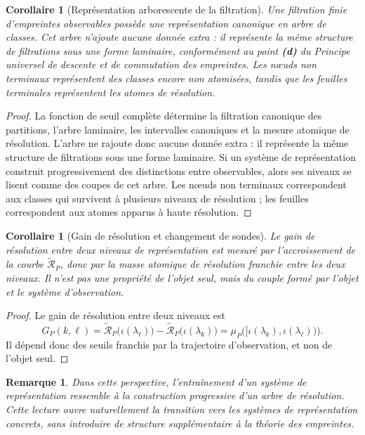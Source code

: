 \documentclass[11pt,a4paper,openany]{book}
\newtheorem{corollary}[definition]{Corollaire}
\newtheorem{remark}[definition]{Remarque}
\begin{document}
\begin{corollary}[Représentation arborescente de la filtration]
Une filtration finie d'empreintes observables possède une représentation canonique en arbre de classes. Cet arbre n'ajoute aucune donnée extra : il représente la même structure de filtrations sous une forme laminaire, conformément au point \textbf{(d)} du \emph{Principe universel de descente et de commutation des empreintes}. Les nœuds non terminaux représentent des classes encore non atomisées, tandis que les feuilles terminales représentent les atomes de résolution.
\end{corollary}

\begin{proof}
La fonction de seuil complète détermine la filtration canonique des partitions, l'arbre laminaire, les intervalles canoniques et la mesure atomique de résolution. L'arbre ne rajoute donc aucune donnée extra : il représente la même structure de filtrations sous une forme laminaire. Si un système de représentation construit progressivement des distinctions entre observables, alors ses niveaux se lisent comme des coupes de cet arbre. Les nœuds non terminaux correspondent aux classes qui survivent à plusieurs niveaux de résolution ; les feuilles correspondent aux atomes apparus à haute résolution.
\end{proof}

\begin{corollary}[Gain de résolution et changement de sondes]
Le gain de résolution entre deux niveaux de représentation est mesuré par l'accroissement de la courbe \(\widetilde{\mathcal R}_P\), donc par la masse atomique de résolution franchie entre les deux niveaux. Il n'est pas une propriété de l'objet seul, mais du couple formé par l'objet et le système d'observation.
\end{corollary}

\begin{proof}
Le gain de résolution entre deux niveaux est
\[
G_P(k,\ell)
=
\widetilde{\mathcal R}_P\bigl(\iota(\lambda_\ell)\bigr)
-
\widetilde{\mathcal R}_P\bigl(\iota(\lambda_k)\bigr)
=
\mu_P\bigl([\iota(\lambda_k),\iota(\lambda_\ell))\bigr).
\]
Il dépend donc des seuils franchis par la trajectoire d'observation, et non de l'objet seul.
\end{proof}

\begin{remark}
Dans cette perspective, l'entraînement d'un système de représentation ressemble à la construction progressive d'un arbre de résolution. Cette lecture ouvre naturellement la transition vers les systèmes de représentation concrets, sans introduire de structure supplémentaire à la théorie des empreintes.
\end{remark}
\end{document}
